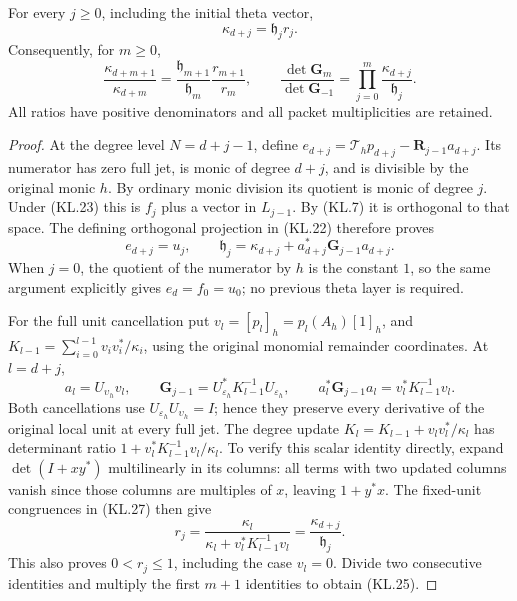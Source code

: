 \begin{theorem}
For every \(j\geq0\), including the initial theta vector,
\[
 \boxed{\kappa_{d+j}=\mathfrak h_j r_j.}                \tag{KL.24}
\]
Consequently, for \(m\geq0\),
\[
 \boxed{\frac{\kappa_{d+m+1}}{\kappa_{d+m}}
    =\frac{\mathfrak h_{m+1}}{\mathfrak h_m}
                         \frac{r_{m+1}}{r_m},\qquad
 \frac{\det\mathbf G_m}{\det\mathbf G_{-1}}
    =\prod_{j=0}^m\frac{\kappa_{d+j}}{\mathfrak h_j}.} \tag{KL.25}
\]
All ratios have positive denominators and all packet multiplicities
are retained.
\end{theorem}
\begin{proof}
At the degree level \(N=d+j-1\), define
\(e_{d+j}=\mathcal T_hp_{d+j}-\mathbf R_{j-1}a_{d+j}\).
Its numerator has zero full jet, is monic of degree \(d+j\),
and is divisible by the original monic \(h\).  By ordinary monic
division its quotient is monic of degree \(j\).  Under (KL.23)
this is \(f_j\) plus a vector in \(L_{j-1}\).  By (KL.7)
it is orthogonal to that space.  The defining orthogonal projection
in (KL.22) therefore proves
\[
 e_{d+j}=u_j,
 \qquad
 \mathfrak h_j=\kappa_{d+j}
                       +a_{d+j}^*\mathbf G_{j-1}a_{d+j}.
                                                               \tag{KL.26}
\]
When \(j=0\), the quotient of the numerator by \(h\) is the
constant \(1\), so the same argument explicitly gives
\(e_d=f_0=u_0\); no previous theta layer is required.

For the full unit cancellation put
\(v_l=[p_l]_h=p_l(A_h)[1]_h\), and
\(K_{l-1}=\sum_{i=0}^{l-1}v_iv_i^*/\kappa_i\), using the
original monomial remainder coordinates.  At \(l=d+j\),
\[
 a_l=U_{\upsilon_h}v_l,\qquad
 \mathbf G_{j-1}=U_{\varepsilon_h}^*K_{l-1}^{-1}
                                      U_{\varepsilon_h},
 \qquad
 a_l^*\mathbf G_{j-1}a_l=v_l^*K_{l-1}^{-1}v_l.          \tag{KL.27}
\]
Both cancellations use
\(U_{\varepsilon_h}U_{\upsilon_h}=I\); hence they preserve
every derivative of the original local unit at every full jet.
The degree update
\(K_l=K_{l-1}+v_lv_l^*/\kappa_l\) has determinant ratio
\(1+v_l^*K_{l-1}^{-1}v_l/\kappa_l\).  To verify this scalar
identity directly, expand \(\det(I+xy^*)\) multilinearly in
its columns: all terms with two updated columns vanish since those
columns are multiples of \(x\), leaving \(1+y^*x\).
The fixed-unit congruences in (KL.27) then give
\[
 r_j=\frac{\kappa_l}
          {\kappa_l+v_l^*K_{l-1}^{-1}v_l}
     =\frac{\kappa_{d+j}}{\mathfrak h_j}.
\]
This also proves \(0<r_j\leq1\), including the case \(v_l=0\).
Divide two consecutive identities and multiply the first \(m+1\)
identities to obtain (KL.25).
\end{proof}


